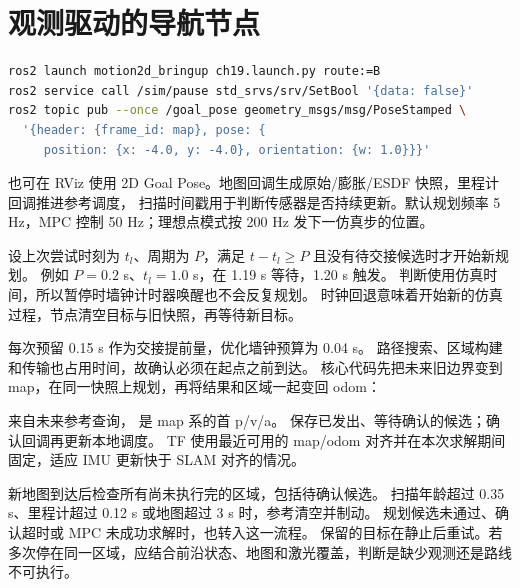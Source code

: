 \section{观测驱动的导航节点}
\begin{lstlisting}[language=bash,numbers=none]
ros2 launch motion2d_bringup ch19.launch.py route:=B
ros2 service call /sim/pause std_srvs/srv/SetBool '{data: false}'
ros2 topic pub --once /goal_pose geometry_msgs/msg/PoseStamped \
  '{header: {frame_id: map}, pose: {
     position: {x: -4.0, y: -4.0}, orientation: {w: 1.0}}}'
\end{lstlisting}
也可在 RViz 使用 2D Goal Pose。地图回调生成原始/膨胀/ESDF 快照，里程计回调推进参考调度，
扫描时间戳用于判断传感器是否持续更新。默认规划频率 5 Hz，MPC 控制 50 Hz；理想点模式按 200 Hz 发下一仿真步的位置。

设上次尝试时刻为 $t_l$、周期为 $P$，满足 $t-t_l\geq P$ 且没有待交接候选时才开始新规划。
例如 $P=0.2$ s、$t_l=1.0$ s，在 1.19 s 等待，1.20 s 触发。
判断使用仿真时间，所以暂停时墙钟计时器唤醒也不会反复规划。
时钟回退意味着开始新的仿真过程，节点清空目标与旧快照，再等待新目标。

每次预留 0.15 s 作为交接提前量，优化墙钟预算为 0.04 s。
路径搜索、区域构建和传输也占用时间，故确认必须在起点之前到达。
核心代码先把未来旧边界变到 map，在同一快照上规划，再将结果和区域一起变回 odom：
\par\noindent\begin{minipage}{\linewidth}

\end{minipage}\par
{} 来自未来参考查询， 是 map 系的首 p/v/a。
 保存已发出、等待确认的候选；确认回调再更新本地调度。
TF 使用最近可用的 map/odom 对齐并在本次求解期间固定，适应 IMU 更新快于 SLAM 对齐的情况。

新地图到达后检查所有尚未执行完的区域，包括待确认候选。
扫描年龄超过 0.35 s、里程计超过 0.12 s 或地图超过 3 s 时，参考清空并制动。
规划候选未通过、确认超时或 MPC 未成功求解时，也转入这一流程。
保留的目标在静止后重试。若多次停在同一区域，应结合前沿状态、地图和激光覆盖，判断是缺少观测还是路线不可执行。

